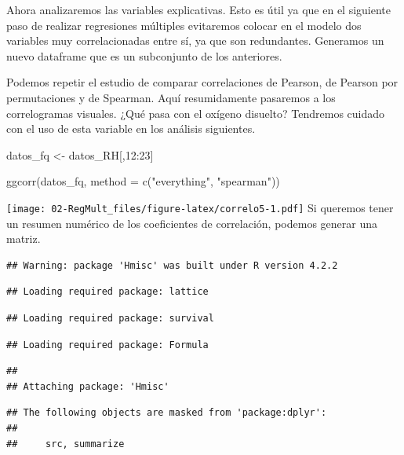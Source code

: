 \documentclass[
]{book}
\newenvironment{Shaded}{\begin{snugshade}}{\end{snugshade}}
\newcommand{\AttributeTok}[1]{\textcolor[rgb]{0.77,0.63,0.00}{#1}}
\newcommand{\DecValTok}[1]{\textcolor[rgb]{0.00,0.00,0.81}{#1}}
\newcommand{\FunctionTok}[1]{\textcolor[rgb]{0.00,0.00,0.00}{#1}}
\newcommand{\NormalTok}[1]{#1}
\newcommand{\OtherTok}[1]{\textcolor[rgb]{0.56,0.35,0.01}{#1}}
\newcommand{\SpecialCharTok}[1]{\textcolor[rgb]{0.00,0.00,0.00}{#1}}
\newcommand{\StringTok}[1]{\textcolor[rgb]{0.31,0.60,0.02}{#1}}
\begin{document}
Ahora analizaremos las variables explicativas. Esto es útil ya que en el siguiente paso de realizar regresiones múltiples evitaremos colocar en el modelo dos variables muy correlacionadas entre sí, ya que son redundantes. Generamos un nuevo dataframe que es un subconjunto de los anteriores.

Podemos repetir el estudio de comparar correlaciones de Pearson, de Pearson por permutaciones y de Spearman. Aquí resumidamente pasaremos a los correlogramas visuales. ¿Qué pasa con el oxígeno disuelto? Tendremos cuidado con el uso de esta variable en los análisis siguientes.

\begin{Shaded}
\begin{Highlighting}[]
\NormalTok{datos\_fq }\OtherTok{\textless{}{-}}\NormalTok{ datos\_RH[,}\DecValTok{12}\SpecialCharTok{:}\DecValTok{23}\NormalTok{]}

\FunctionTok{ggcorr}\NormalTok{(datos\_fq, }\AttributeTok{method =} \FunctionTok{c}\NormalTok{(}\StringTok{"everything"}\NormalTok{, }\StringTok{"spearman"}\NormalTok{)) }
\end{Highlighting}
\end{Shaded}

\texttt{[image: 02-RegMult\_files/figure-latex/correlo5-1.pdf]}
Si queremos tener un resumen numérico de los coeficientes de correlación, podemos generar una matriz.

\begin{verbatim}
## Warning: package 'Hmisc' was built under R version 4.2.2
\end{verbatim}

\begin{verbatim}
## Loading required package: lattice
\end{verbatim}

\begin{verbatim}
## Loading required package: survival
\end{verbatim}

\begin{verbatim}
## Loading required package: Formula
\end{verbatim}

\begin{verbatim}
## 
## Attaching package: 'Hmisc'
\end{verbatim}

\begin{verbatim}
## The following objects are masked from 'package:dplyr':
## 
##     src, summarize
\end{verbatim}
\end{document}
